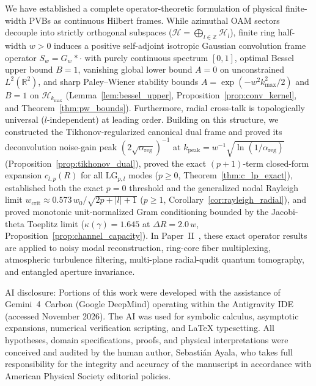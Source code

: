 \documentclass[aps,pra,reprint,nofootinbib,floatfix,longbibliography]{revtex4-2}
\theoremstyle{remark}
\newcommand{\abs}[1]{\lvert #1 \rvert}
\begin{document}
We have established a complete operator-theoretic formulation of physical finite-width PVBs as continuous Hilbert frames. While azimuthal OAM sectors decouple into strictly orthogonal subspaces ($\mathcal{H} = \bigoplus_{l\in\mathbb{Z}}\mathcal{H}_l$), finite ring half-width $w > 0$ induces a positive self-adjoint isotropic Gaussian convolution frame operator $S_w = G_w * \cdot$ with purely continuous spectrum $[0,1]$, optimal Bessel upper bound $B = 1$, vanishing global lower bound $A = 0$ on unconstrained $L^2(\mathbb{R}^2)$, and sharp Paley--Wiener stability bounds $A = \exp(-w^2 k_{\max}^2/2)$ and $B = 1$ on $\mathcal{H}_{k_{\max}}$ (Lemma~\ref{lem:bessel_upper}, Proposition~\ref{prop:conv_kernel}, and Theorem~\ref{thm:pw_bounds}). Furthermore, radial cross-talk is topologically universal ($l$-independent) at leading order. Building on this structure, we constructed the Tikhonov-regularized canonical dual frame and proved its deconvolution noise-gain peak $(2\sqrt{\alpha_{\mathrm{reg}}})^{-1}$ at $k_{\mathrm{peak}} = w^{-1}\sqrt{\ln(1/\alpha_{\mathrm{reg}})}$ (Proposition~\ref{prop:tikhonov_dual}), proved the exact $(p+1)$-term closed-form expansion $c_{l,p}(R)$ for all $\mathrm{LG}_{p,l}$ modes ($p \ge 0$, Theorem~\ref{thm:c_lp_exact}), established both the exact $p = 0$ threshold and the generalized nodal Rayleigh limit $w_{\mathrm{crit}} \approx 0.573\,w_0/\sqrt{2p+\abs{l}+1}$ ($p \ge 1$, Corollary~\ref{cor:rayleigh_radial}), and proved monotonic unit-normalized Gram conditioning bounded by the Jacobi-theta Toeplitz limit ($\kappa(\gamma) = 1.645$ at $\Delta R = 2.0\,w$, Proposition~\ref{prop:channel_capacity}). In Paper~II~\cite{AyalaPaperII}, these exact operator results are applied to noisy modal reconstruction, ring-core fiber multiplexing, atmospheric turbulence filtering, multi-plane radial-qudit quantum tomography, and entangled aperture invariance.

\begin{acknowledgments}
AI disclosure: Portions of this work were developed with the assistance of Gemini~4~Carbon (Google DeepMind) operating within the Antigravity IDE (accessed November 2026). The AI was used for symbolic calculus, asymptotic expansions, numerical verification scripting, and \LaTeX{} typesetting. All hypotheses, domain specifications, proofs, and physical interpretations were conceived and audited by the human author, Sebasti\'an Ayala, who takes full responsibility for the integrity and accuracy of the manuscript in accordance with American Physical Society editorial policies.
\end{acknowledgments}
\end{document}
